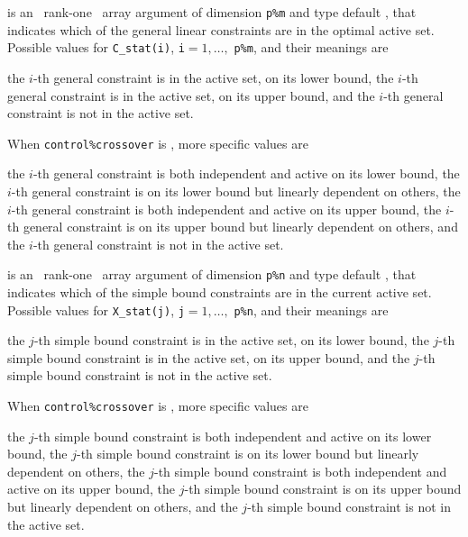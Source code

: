 \documentclass{galahad}
\begin{document}
\begin{description}
 is an \optional\ rank-one \intentout\ array argument of
dimension {\tt p\%m}
and type default \integer, that indicates which of the general linear
constraints are in the optimal active set. Possible values for
{\tt C\_stat(i)}, {\tt i}$=1, \ldots ,$ {\tt p\%m}, and their meanings are
\begin{description}
 the $i$-th general constraint
is in the active set, on its lower bound,
 the $i$-th general constraint
is in the active set, on its upper bound, and
  the $i$-th general constraint is not in the active set.
\end{description}
When {\tt control\%crossover} is \true, more specific values are
\begin{description}
 the $i$-th general constraint
is both independent and active on its lower bound,
 the $i$-th general constraint
is on its lower bound but linearly dependent on others,
 the $i$-th general constraint
is both independent and active on its upper bound,
 the $i$-th general constraint
is on its upper bound but linearly dependent on others, and
 the $i$-th general constraint is not in the active set.
\end{description}

 is an \optional\ rank-one \intentout\ array argument of
dimension {\tt p\%n}
and type default \integer, that indicates which of the simple bound
constraints are in the current active set. Possible values for
{\tt X\_stat(j)}, {\tt j}$=1, \ldots ,$ {\tt p\%n}, and their meanings are
\begin{description}
 the $j$-th simple bound constraint
is in the active set, on its lower bound,
 the $j$-th simple bound constraint
is in the active set, on its upper bound, and
  the $j$-th simple bound constraint is not in the active set.
\end{description}
When {\tt control\%crossover} is \true, more specific values are
\begin{description}
 the $j$-th simple bound constraint
is both independent and active on its lower bound,
 the $j$-th simple bound constraint
is on its lower bound but linearly dependent on others,
 the $j$-th simple bound constraint
is both independent and active on its upper bound,
 the $j$-th simple bound constraint
is on its upper bound but linearly dependent on others, and
 the $j$-th simple bound constraint is not in the active set.
\end{description}

\end{description}
\end{document}

